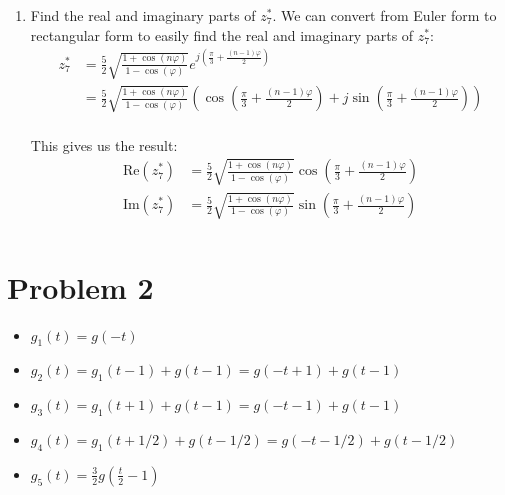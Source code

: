 \documentclass{article}
\begin{document}
\begin{enumerate}
    \item Find the real and imaginary parts of $z^*_7$.
    We can convert from Euler form to rectangular form to easily find the real and imaginary parts of $z^*_7$:
    \begin{align*}
        z^*_7 &=  \frac{5}{2}\sqrt{\frac{1+\cos(n\varphi)}{1-\cos(\varphi)}}e^{j\left(\frac{\pi}{3} + \frac{(n-1)\varphi}{2}\right)} \\
        &= \frac{5}{2}\sqrt{\frac{1+\cos(n\varphi)}{1-\cos(\varphi)}}\left(\cos\left(\frac{\pi}{3} + \frac{(n-1)\varphi}{2}\right) + j\sin\left(\frac{\pi}{3} + \frac{(n-1)\varphi}{2}\right)\right) \\
    \end{align*}

    This gives us the result:
    \begin{align*}
        \text{Re}(z^*_7) &= \frac{5}{2}\sqrt{\frac{1+\cos(n\varphi)}{1-\cos(\varphi)}}\cos\left(\frac{\pi}{3} + \frac{(n-1)\varphi}{2}\right) \\
        \text{Im}(z^*_7) &= \frac{5}{2}\sqrt{\frac{1+\cos(n\varphi)}{1-\cos(\varphi)}}\sin\left(\frac{\pi}{3} + \frac{(n-1)\varphi}{2}\right) \\
    \end{align*}
\end{enumerate}

\section{Problem 2}

\begin{itemize}
    \item $g_1(t) = g(-t)$
    \item $g_2(t) = g_1(t-1) + g(t-1) = g(-t+1) + g(t-1)$
    \item $g_3(t) = g_1(t+1) + g(t-1) = g(-t-1) + g(t-1)$
    \item $g_4(t) = g_1(t+1/2) + g(t-1/2) = g(-t-1/2) + g(t-1/2)$
    \item $g_5(t) = \frac{3}{2}g(\frac{t}{2}-1)$
\end{itemize}
\newpage
\end{document}

